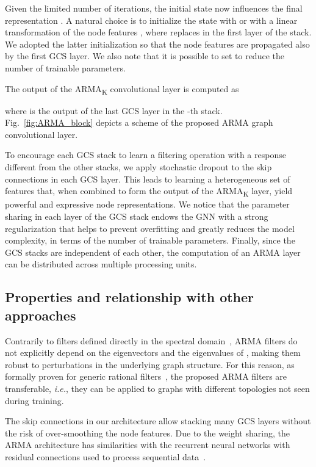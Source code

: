 \documentclass{article}
\begin{document}
Given the limited number of iterations, the initial state  now influences the final representation . 
A natural choice is to initialize the state with  or with a linear transformation of the node features , where  replaces  in the first layer of the stack.
We adopted the latter initialization so that the node features are propagated also by the first GCS layer.
We also note that it is possible to set  to reduce the number of trainable parameters.

The output of the ARMA\textsubscript{K} convolutional layer is computed as

where  is the output of the last GCS layer in the -th stack.
Fig.~\ref{fig:ARMA_block} depicts a scheme of the proposed ARMA graph convolutional layer.

To encourage each GCS stack to learn a filtering operation with a response different from the other stacks, we apply stochastic dropout to the skip connections  in each GCS layer.
This leads to learning a heterogeneous set of features that, when combined to form the output of the ARMA\textsubscript{K} layer, yield powerful and expressive node representations.
We notice that the parameter sharing in each layer of the GCS stack endows the GNN with a strong regularization that helps to prevent overfitting and greatly reduces the model complexity, in terms of the number of trainable parameters.
Finally, since the GCS stacks are independent of each other, the computation of an ARMA layer can be distributed across multiple processing units.


\subsection{Properties and relationship with other approaches}
Contrarily to filters defined directly in the spectral domain~\cite{bruna2013spectral}, ARMA filters do not explicitly depend on the eigenvectors and the eigenvalues of , making them robust to perturbations in the underlying graph structure. 
For this reason, as formally proven for generic rational filters~\cite{transfer2019}, the proposed ARMA filters are transferable, \emph{i.e.}, they can be applied to graphs with different topologies not seen during training.



The skip connections in our architecture allow stacking many GCS layers without the risk of over-smoothing the node features.
Due to the weight sharing, the ARMA architecture has similarities with the recurrent neural networks with residual connections used to process sequential data~\cite{wu2016google}.
\end{document}
